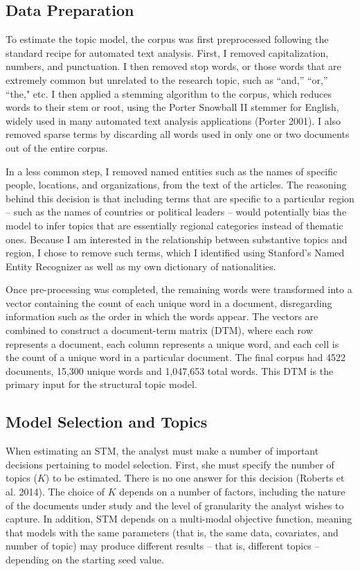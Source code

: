 \documentclass[11pt, oneside]{article}
\begin{document}
\subsection{Data Preparation}

To estimate the topic model, the corpus was first preprocessed following the standard recipe for automated text analysis. First, I removed capitalization, numbers, and punctuation. I then removed stop words, or those words that are extremely common but unrelated to the research topic, such as ``and,'' ``or,'' ``the," etc.  I then applied a stemming algorithm to the corpus, which reduces words to their stem or root, using the Porter Snowball II stemmer for English, widely used in many automated text analysis applications (Porter 2001). I also removed sparse terms by discarding all words used in only one or two documents out of the entire corpus. 

In a less common step, I removed named entities such as the names of specific people, locations, and organizations, from the text of the articles. The reasoning behind this decision is that including terms that are specific to a particular region -- such as the names of countries or political leaders -- would potentially bias the model to infer topics that are essentially regional categories instead of thematic ones. Because I am interested in the relationship between substantive topics and region, I chose to remove such terms, which I identified using Stanford's Named Entity Recognizer as well as my own dictionary of nationalities.

Once pre-processing was completed, the remaining words were transformed into a vector containing the count of each unique word in a document, disregarding information such as the order in which the words appear.  The vectors are combined to construct a document-term matrix (DTM), where each row represents a document, each column represents a unique word, and each cell is the count of a unique word in a particular document. The final corpus had 4522 documents, 15,300 unique words and 1,047,653 total words. This DTM is the primary input for the structural topic model. 
	
\subsection{Model Selection and Topics}

When estimating an STM, the analyst must make a number of important decisions pertaining to model selection. First, she must specify the number of topics ($K$) to be estimated. There is no one answer for this decision (Roberts et al. 2014). The choice of $K$ depends on a number of factors, including the nature of the documents under study and the level of granularity the analyst wishes to capture. In addition, STM depends on a multi-modal objective function, meaning that models with the same parameters (that is, the same data, covariates, and number of topic) may produce different results -- that is, different topics -- depending on the starting seed value.
\end{document}
